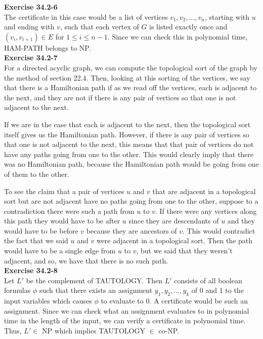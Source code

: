 \documentclass{article}
\begin{document}
\noindent\textbf{Exercise 34.2-6}\\

The certificate in this case would be a list of vertices $v_1, v_2, \ldots, v_n$, starting with $u$ and ending with $v$, such that each vertex of $G$ is listed exactly once and $(v_i, v_{i+1}) \in E$ for $1 \leq i \leq n-1$.  Since we can check this in polynomial time, HAM-PATH belongs to NP. \\

\noindent\textbf{Exercise 34.2-7}\\

For a directed acyclic graph, we can compute the topological sort of the graph by the method of section 22.4. Then, looking at this sorting of the vertices, we say that there is a Hamiltonian path if as we read off the vertices, each is adjacent to the next, and they are not if there is any pair of vertices so that one is not adjacent to the next.

If we are in the case that each is adjacent to the next, then the topological sort itself gives us the Hamiltonian path. However, if there is any pair of vertices so that one is not adjacent to the next, this means that that pair of vertices do not have any paths going from one to the other. This would clearly imply that there was no Hamiltonian path, because the Hamiltonian path would be going from one of them to the other.

To see the claim that a pair of vertices $u$ and $v$ that are adjacent in a topological sort but are not adjacent have no paths going from one to the other, suppose to a contradiction there were such a path from $u$ to $v$. If there were any vertices along this path they would have to be after $u$ since they are descendants of $u$ and they would have to be before $v$ because they are ancestors of $v$. This would contradict the fact that we said $u$ and $v$ were adjacent in a topological sort. Then the path would have to be a single edge from $u$ to $v$, but we said that they weren't adjacent, and so, we have that there is no such path.\\

\noindent\textbf{Exercise 34.2-8}\\

Let $L'$ be the complement of TAUTOLOGY.  Then $L'$ consists of all boolean formulas $\phi$ such that there exists an assignment $y_1, y_2, \ldots, y_k$ of 0 and 1 to the input variables which causes $\phi$ to evaluate to 0.  A certificate would be such an assignment.  Since we can check what an assignment evaluates to in polynomial time in the length of the input, we can verify a certificate in polynomial time. Thus, $L' \in $ NP which implies TAUTOLOGY $\in$ co-NP.\\
\end{document}

